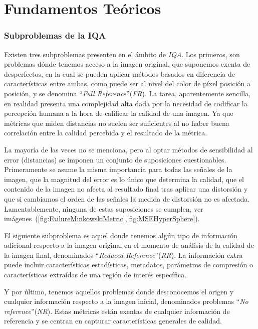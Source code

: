 \chapter{Fundamentos Teóricos}

\subsection{Subproblemas de la IQA}
Existen tres subproblemas presenten en el ámbito de \emph{IQA}. Los primeros, son problemas 
dónde tenemos acceso a la imagen original, que suponemos exenta de desperfectos, 
en la cual se pueden aplicar métodos basados en diferencia de características 
entre ambas, como puede ser al nivel del color de píxel posición a posición,
y se denomina ``\emph{Full Reference}''(\emph{FR}). 
La tarea, aparentemente sencilla, en realidad presenta una complejidad alta dada por 
la necesidad de codificar la percepción humana a la hora de calificar la calidad 
de una imagen\cite{WhyIsIQASoDifficult}. Ya que métricas que miden distancias no suelen 
ser suficientes al no haber buena correlación entre la calidad percebida y el 
resultado de la métrica.

La mayoría de las veces no se menciona, pero al optar métodos de sensibilidad 
al error (distancias) se imponen un conjunto de suposiciones cuestionables. 
Primeramente se asume la misma importancia para todas las señales de la imagen, que
la magnitud del error es lo único que determina la calidad, que el contenido de la imagen 
no afecta al resultado final tras aplicar una distorsión y que si cambiamos el 
orden de las señales la medida de distorsión no es afectada.
Lamentablemente, ninguna de estas suposiciones se cumplen\cite{Wang2006ModernIQ}, ver imágenes~(\ref{fig:FailureMinkowskiMetric},\ref{fig:MSEHyperSphere}).
 
El siguiente subproblema es aquel donde tenemos algún tipo de información adicional respecto 
a la imagen original en el momento de análisis de la calidad de la imagen final,
denominados ``\emph{Reduced Reference}''(\emph{RR}). La información extra puede incluir características estadísticas, metadatos, parámetros 
de compresión o características extraídas de una región de interés específica.
 
Y por último, tenemos aquellos problemas donde desconocemos el origen y cualquier 
información respecto a la imagen inicial, denominados problemas ``\emph{No reference}''(\emph{NR}).
Estas métricas están exentas de cualquier información de referencia y se 
centran en capturar características generales de calidad. 

